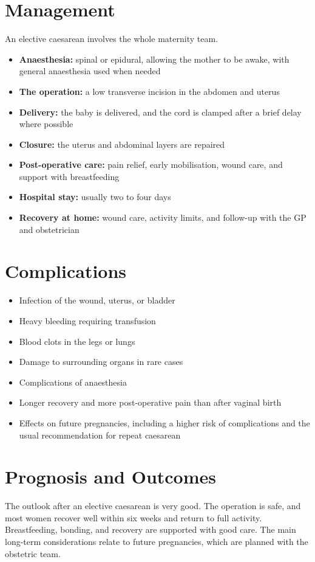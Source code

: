 \section*{Management}
An elective caesarean involves the whole maternity team.
\begin{itemize}
    \item \textbf{Anaesthesia:} spinal or epidural, allowing the mother to be awake, with general anaesthesia used when needed
    \item \textbf{The operation:} a low transverse incision in the abdomen and uterus
    \item \textbf{Delivery:} the baby is delivered, and the cord is clamped after a brief delay where possible
    \item \textbf{Closure:} the uterus and abdominal layers are repaired
    \item \textbf{Post-operative care:} pain relief, early mobilisation, wound care, and support with breastfeeding
    \item \textbf{Hospital stay:} usually two to four days
    \item \textbf{Recovery at home:} wound care, activity limits, and follow-up with the GP and obstetrician
\end{itemize}

\section*{Complications}
\begin{itemize}
    \item Infection of the wound, uterus, or bladder
    \item Heavy bleeding requiring transfusion
    \item Blood clots in the legs or lungs
    \item Damage to surrounding organs in rare cases
    \item Complications of anaesthesia
    \item Longer recovery and more post-operative pain than after vaginal birth
    \item Effects on future pregnancies, including a higher risk of complications and the usual recommendation for repeat caesarean
\end{itemize}

\section*{Prognosis and Outcomes}
The outlook after an elective caesarean is very good. The operation is safe, and most women recover well within six weeks and return to full activity. Breastfeeding, bonding, and recovery are supported with good care. The main long-term considerations relate to future pregnancies, which are planned with the obstetric team.

